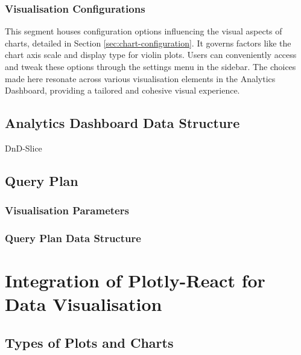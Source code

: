 \subsubsection{Visualisation Configurations}

This segment houses configuration options influencing the visual aspects of charts, detailed in Section \ref{sec:chart-configuration}. It governs factors like the chart axis scale and display type for violin plots. Users can conveniently access and tweak these options through the settings menu in the sidebar. The choices made here resonate across various visualisation elements in the Analytics Dashboard, providing a tailored and cohesive visual experience.










\subsection{Analytics Dashboard Data Structure}\label{sec:analytics-dashboard}
DnD-Slice








\subsection{Query Plan}
\subsubsection{Visualisation Parameters}\label{sec:query-plan-parameters}
\subsubsection{Query Plan Data Structure}\label{sec:query-plan-structure}















\section{Integration of Plotly-React for Data Visualisation}
\subsection{Types of Plots and Charts}
